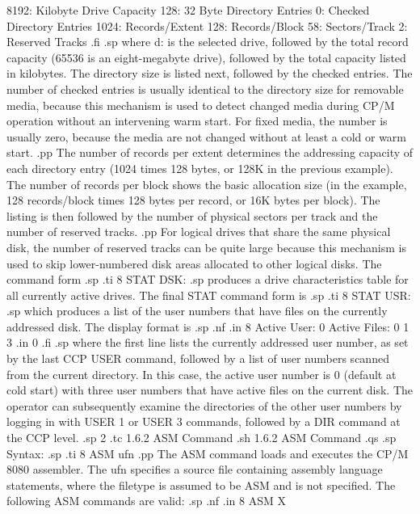          8192: Kilobyte Drive Capacity
          128: 32 Byte Directory Entries
            0: Checked Directory Entries
         1024: Records/Extent
          128: Records/Block
           58: Sectors/Track
            2: Reserved Tracks
.fi
.sp
where d: is the selected drive, followed by the total record capacity
(65536 is an eight-megabyte drive), followed by the total capacity listed in
kilobytes.  The directory size is listed next, followed by the checked
entries.  The number of checked entries is usually identical to the directory
size for removable media, because this mechanism is used to detect changed
media during CP/M operation without an intervening warm start.  For fixed
media, the number is usually zero, because the media are not changed without
at least a cold or warm start.
.pp
The number of records per extent determines
the addressing capacity of each directory entry (1024 times 128 bytes, or
128K in the previous example).  The number of records per block shows the
basic allocation size (in the example, 128 records/block times 128 bytes per
record, or 16K bytes per block).  The listing is then followed by the number
of physical sectors per track and the number of reserved tracks.
.pp
For logical
drives that share the same physical disk, the number of reserved tracks can
be quite large because this mechanism is used to skip lower-numbered disk
areas allocated to other logical disks.  The command form
.sp
.ti 8
STAT DSK:
.sp
produces a drive characteristics table for all currently active drives.  The
final STAT command form is
.sp
.ti 8
STAT USR:
.sp
which produces a list of the user numbers that have files on the currently
addressed disk.  The display format is
.sp
.nf
.in 8
Active User:   0
Active Files:  0 1 3
.in 0
.fi
.sp
where the first line lists the currently addressed user number, as set by the
last CCP USER command, followed by a list of user numbers scanned from the
current directory. In this case, the active user number is 0 (default at cold
start) with three user numbers that have active files on the current disk.
The operator can subsequently examine the directories of the other user
numbers by logging in with USER 1 or USER 3 commands, followed by a DIR
command at the CCP level.
.sp 2
.tc         1.6.2  ASM Command
.sh
1.6.2  ASM Command
.qs
.sp
Syntax:
.sp
.ti 8
ASM ufn
.pp
The ASM command loads and executes the CP/M 8080 assembler.  The ufn
specifies a source file containing assembly language statements, where the
filetype is assumed to be ASM and is not specified.  The following ASM
commands are valid:
.sp
.nf
.in 8
ASM X
